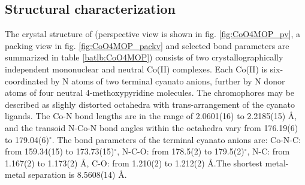 \subsection{Structural characterization}
The crystal structure of  (perspective view is shown in fig. \ref{fig:CoO4MOP_pv}, a packing view in fig. \ref{fig:CoO4MOP_packv} and selected bond parameters are summarized in table \ref{batlb:CoO4MOP}) consists of two crystallographically independent mononuclear and neutral Co(II) complexes. Each Co(II) is six-coordinated by N atoms of two terminal cyanato anions, further by N donor atoms of four neutral 4-methoxypyridine molecules. The  chromophores may be described as slighly distorted octahedra with trans-arrangement of the cyanato ligands. The Co-N bond lengths are in the range of 2.0601(16) to 2.2185(15) \AA, and the transoid N-Co-N bond angles within the  octahedra vary from 176.19(6) to 179.04(6)$^\circ$. The bond parameters of the terminal cyanato anions are: Co-N-C: from 159.34(15) to 173.73(15)$^\circ$, N-C-O: from 178.5(2) to 179.5(2)$^\circ$, N-C: from 1.167(2) to 1.173(2) \AA, C-O: from 1.210(2) to 1.212(2) \AA.The shortest metal-metal separation is 8.5608(14) \AA. 


